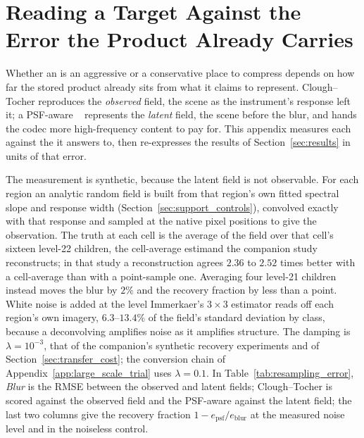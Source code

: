 \section{Reading a Target Against the Error the Product Already Carries}
\label{app:error_budget}\label{sec:error_budget}
Whether an  is an aggressive or a conservative place to
compress depends on how far the stored product already sits from what it
claims to represent. Clough--Tocher reproduces the \emph{observed} field,
the scene as the instrument's response left it; a PSF-aware
~\cite{delouis2026resample} represents the \emph{latent} field,
the scene before the blur, and hands the codec more high-frequency
content to pay for. This appendix measures each  against the
 it answers to, then re-expresses the results of
Section~\ref{sec:results} in units of that error.

The measurement is synthetic, because the latent field is not
observable. For each region an analytic random field is built from that
region's own fitted spectral slope and response width
(Section~\ref{sec:support_controls}), convolved exactly with that
response and sampled at the native pixel positions to give the
observation. The truth at each  cell is the average of the field
over that cell's sixteen level-22 children, the cell-average estimand
the companion study reconstructs; in that study a reconstruction agrees
$2.36$ to $2.52$ times better with a cell-average  than with a
point-sample one. Averaging four level-21 children instead moves the
blur by $2\%$ and the recovery fraction by less than a point. White
noise is added at the level Immerkaer's $3\times3$ estimator reads off
each region's own imagery, $6.3$--$13.4\%$ of the field's standard
deviation by class, because a deconvolving  amplifies noise as
it amplifies structure. The damping is $\lambda=10^{-3}$, that of the companion's synthetic
recovery experiments and of
Section~\ref{sec:transfer_cost}; the conversion chain of
Appendix~\ref{app:large_scale_trial} uses $\lambda=0.1$. In
Table~\ref{tab:resampling_error}, \emph{Blur} is the RMSE between the
observed and latent fields; Clough--Tocher is scored against the observed
field and the PSF-aware  against the latent field; the last two
columns give the recovery fraction $1 - e_{\mathrm{psf}}/e_{\mathrm{blur}}$
at the measured noise level and in the noiseless control.



